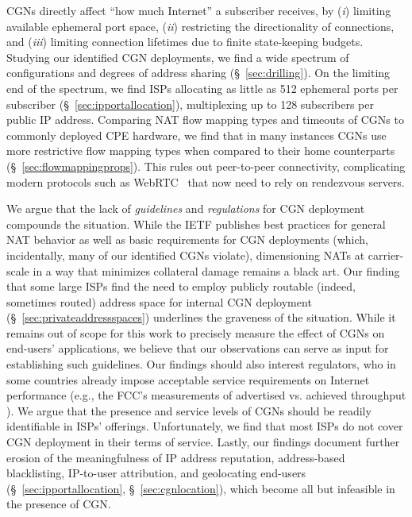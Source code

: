 \documentclass[10pt]{sig-alternate-05-2015}
\newcommand\xref[1]{\S~\ref{#1}}
\def\first{({\it i})\xspace}
\def\second{({\it ii})\xspace}
\def\third{({\it iii})\xspace}
\begin{document}
CGNs directly affect ``how much Internet'' a subscriber receives, by \first
limiting available ephemeral port space, \second restricting 
the directionality of connections, and \third limiting connection 
lifetimes due to finite state-keeping budgets.  Studying our identified CGN 
deployments, we find 
a wide spectrum of configurations and degrees of address sharing 
(\xref{sec:drilling}). On the limiting end of the spectrum, we find ISPs 
allocating as little as 512 ephemeral ports per subscriber
(\xref{sec:ipportallocation}), multiplexing up to 128 subscribers per public 
IP address. Comparing NAT flow mapping types and timeouts of CGNs to commonly 
deployed CPE hardware, we find that in many instances CGNs use more 
restrictive flow mapping types when compared to their home counterparts 
(\xref{sec:flowmappingprops}). This rules out peer-to-peer connectivity,
complicating modern protocols such as WebRTC~\cite{rfc7478} that now need to
rely on rendezvous servers.

We argue that the lack of \textit{guidelines} and \textit{regulations}
for CGN deployment compounds the situation. While the IETF publishes
best practices for general NAT behavior \cite{rfc4787,rfc5382,rfc7857}
as well as basic requirements for CGN deployments \cite{rfc6888}
(which, incidentally, many of our identified CGNs violate),
dimensioning NATs at carrier-scale in a way that minimizes collateral
damage remains a black art. Our finding that some large ISPs find the
need to employ publicly routable (indeed, sometimes routed) address
space for internal CGN deployment (\xref{sec:privateaddressspaces})
underlines the graveness of the situation.
While it remains out of scope for this work to precisely measure the
effect of CGNs on end-users' applications, we believe that our
observations can serve as input for establishing such guidelines.
Our findings should also interest regulators, who in some countries
already impose acceptable service requirements on Internet performance
(e.g., the FCC's measurements of advertised vs. achieved throughput
\cite{johnston2013measuring}).  We argue that the presence and service
levels of CGNs should be readily identifiable in ISPs'
offerings. Unfortunately, we find that most ISPs do not cover CGN
deployment in their terms of service.
Lastly, our findings document further erosion of the meaningfulness of
IP address reputation, address-based blacklisting, IP-to-user
attribution, and geolocating end-users (\xref{sec:ipportallocation},
\xref {sec:cgnlocation}), which become all but infeasible in the
presence of CGN.
\end{document}
